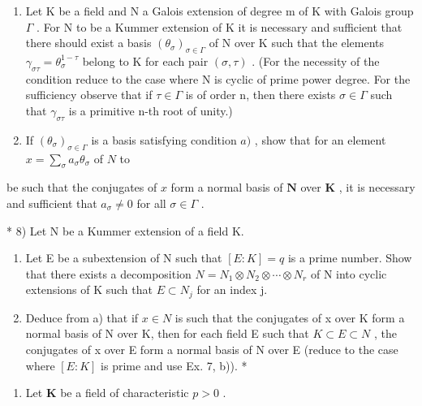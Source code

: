 \begin{enumerate}
\def\labelenumi{\alph{enumi})}
\item
  Let K be a field and N a Galois extension of degree m of K with Galois group \(\Gamma\) . For N to be a Kummer extension of K it is necessary and sufficient that there should exist a basis \((\theta_{\sigma})_{\sigma\in\Gamma}\) of N over K such that the elements \(\gamma_{\sigma\tau}=\theta_{\sigma}^{1-\tau}\) belong to K for each pair \((\sigma,\tau)\) . (For the necessity of the condition reduce to the case where N is cyclic of prime power degree. For the sufficiency observe that if \(\tau\in\Gamma\) is of order n, then there exists \(\sigma\in\Gamma\) such that \(\gamma_{\sigma\tau}\) is a primitive n-th root of unity.)
\item
  If \((\theta_{\sigma})_{\sigma \in \Gamma}\) is a basis satisfying condition \(a)\) , show that for an element \(x = \sum_{\sigma} a_{\sigma} \theta_{\sigma}\) of \(N\) to
\end{enumerate}

be such that the conjugates of \(x\) form a normal basis of \(\mathbf{N}\) over \(\mathbf{K}\) , it is necessary and sufficient that \(a_{\sigma} \neq 0\) for all \(\sigma \in \Gamma\) .

* 8) Let N be a Kummer extension of a field K.

\begin{enumerate}
\def\labelenumi{\alph{enumi})}
\item
  Let E be a subextension of N such that \([E:K]=q\) is a prime number. Show that there exists a decomposition \(N=N_{1}\otimes N_{2}\otimes\cdots\otimes N_{r}\) of N into cyclic extensions of K such that \(E\subset N_{j}\) for an index j.
\item
  Deduce from a) that if \(x \in N\) is such that the conjugates of x over K form a normal basis of N over K, then for each field E such that \(K \subset E \subset N\) , the conjugates of x over E form a normal basis of N over E (reduce to the case where \([E : K]\) is prime and use Ex. 7, b)). *
\end{enumerate}

\begin{enumerate}
\def\labelenumi{\arabic{enumi})}
\setcounter{enumi}{8}
\tightlist
\item
  Let \(\mathbf{K}\) be a field of characteristic \(p > 0\) .
\end{enumerate}

